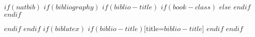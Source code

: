 \documentclass[sigplan,screen,$for(classoption)$$classoption$$sep$,$endfor$]{$documentclass$}
\begin{document}

\appendix

$if(natbib)$
  $if(bibliography)$
    $if(biblio-title)$
      $if(book-class)$
      \renewcommand\bibname{$biblio-title$}
      $else$
      \renewcommand\refname{$biblio-title$}
      $endif$
    $endif$
    
    $endif$
  $endif$
  $if(biblatex)$
  \printbibliography$if(biblio-title)$[title=$biblio-title$]
  $endif$
$endif$
\end{document}
